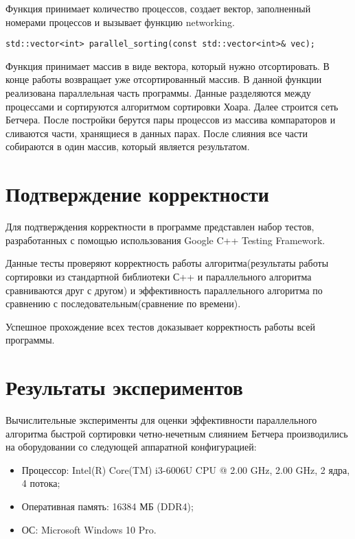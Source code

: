 \documentclass{report}
\begin{document}
\par Функция принимает количество процессов, создает вектор, заполненный номерами процессов и вызывает функцию networking.
\begin{lstlisting}
std::vector<int> parallel_sorting(const std::vector<int>& vec);
\end{lstlisting}
\par Функция принимает массив в виде вектора, который нужно отсортировать. В конце работы возвращает уже отсортированный массив. В данной функции реализована параллельная часть программы. Данные разделяются между процессами и сортируются алгоритмом сортировки Хоара. Далее строится сеть Бетчера. После постройки берутся пары процессов из массива компараторов и сливаются части, хранящиеся в данных парах. После слияния все части собираются в один массив, который является результатом.  

\newpage

\section*{Подтверждение корректности}
Для подтверждения корректности в программе представлен набор тестов, разработанных с помощью использования Google C++ Testing Framework.
\par Данные тесты проверяют корректность работы алгоритма(результаты работы сортировки из стандартной библиотеки С++  и параллельного алгоритма сравниваются друг с другом) и эффективность параллельного алгоритма по сравнению с последовательным(сравнение по времени).
\par Успешное прохождение всех тестов доказывает корректность работы всей программы.
\newpage

\section*{Результаты экспериментов}
Вычислительные эксперименты для оценки эффективности параллельного алгоритма быстрой сортировки четно-нечетным слиянием Бетчера производились на оборудовании со следующей аппаратной конфигурацией:

\begin{itemize}
\item Процессор: Intel(R) Core(TM) i3-6006U CPU @ 2.00 GHz, 2.00 GHz, 2 ядра, 4 потока;
\item Оперативная память: 16384 МБ (DDR4);
\item ОС: Microsoft Windows 10 Pro. 
\end{itemize}
\end{document}
